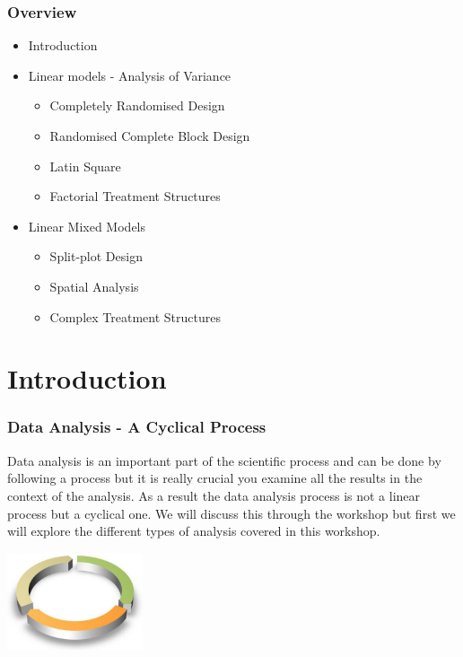 \begin{frame} \frametitle{Overview}
\begin{itemize}
\item Introduction
\item Linear models - Analysis of Variance
\begin{itemize}
\item Completely Randomised Design
\item Randomised Complete Block Design
\item Latin Square
\item Factorial Treatment Structures
\end{itemize}
\item Linear Mixed Models
\begin{itemize}
\item Split-plot Design
\item Spatial Analysis
\item Complex Treatment Structures
\end{itemize}
\end{itemize}

\end{frame}

\section{Introduction}
\begin{frame}\frametitle{Data Analysis - A Cyclical Process}
Data analysis is an important part of the scientific process and can be done by following a process but it is really
crucial you examine all the results in the context of the analysis. As a result the data analysis process is not a
linear process but a cyclical one. We will discuss this through the workshop but first we will explore the different
types of analysis covered in this workshop.

\vspace{1cm}
\centering
\includegraphics[width=0.3\textwidth]{cyclical}
\end{frame}


